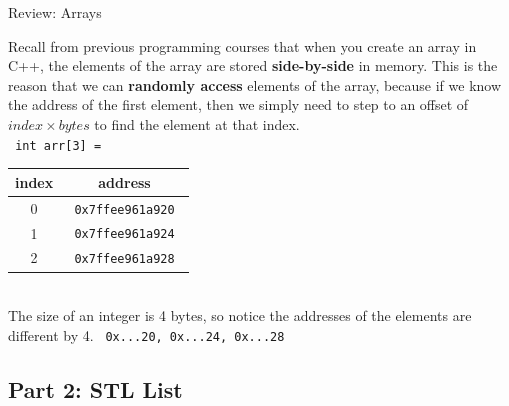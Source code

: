 \documentclass[a4paper,12pt]{book}
\begin{document}
            \newpage
            \begin{intro}{ Review: Arrays }

            Recall from previous programming courses that
            when you create an array in C++, the elements
            of the array are stored \textbf{ side-by-side }
            in memory. This is the reason that we can
            \textbf{ randomly access } elements of the array,
            because if we know the address of the first element,
            then we simply need to step to an offset of
            $ index \times bytes $ to find the element at that index. \\

            \texttt{ int arr[3] = } ~\\

            \begin{center}
                \begin{tabular}{ | c | c | }
                    \hline
                    \textbf{ index } & \textbf{ address } \\ \hline

                    0 & \texttt{ 0x7ffee961a920 }
                    \\ \hline

                    1 & \texttt{ 0x7ffee961a924 }
                    \\ \hline

                    2 & \texttt{ 0x7ffee961a928 }
                    \\ \hline
                    
                \end{tabular}
            \end{center}
            
            ~\\ The size of an integer is 4 bytes, so notice the addresses of the elements are different by 4.
            \texttt{ 0x...20, \tab 0x...24, \tab 0x...28 }
            
            \end{intro}

            \hrulefill{}
            \newpage
            \subsection*{Part 2: STL List}
\end{document}
